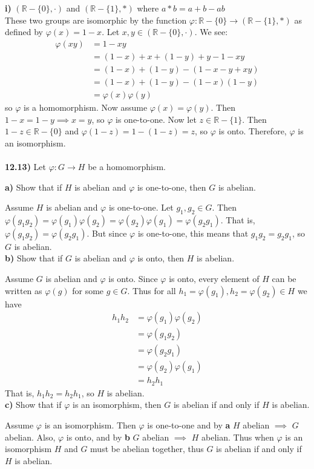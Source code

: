 \documentclass{scrartcl}
\begin{document}
\textbf{i)} $(\mathbb{R}-\{0\},\cdot)$ and $(\mathbb{R}-\{1\},*)$
where $a*b = a+b-ab$\\
These two groups are isomorphic by the function $\varphi : \mathbb{R}-\{0\}
\rightarrow (\mathbb{R}-\{1\},*)$ as defined by $\varphi(x) = 1-x$.
Let $x,y \in (\mathbb{R}-\{0\},\cdot)$. We see:
\begin{align*}
\varphi(xy) &= 1-xy\\
            &= (1-x)+x+(1-y)+y-1-xy\\
            &= (1-x)+(1-y)-(1-x-y+xy)\\
            &= (1-x)+(1-y)-(1-x)(1-y)\\
            &= \varphi(x)\varphi(y)
\end{align*}
so $\varphi$ is a homomorphism. Now assume $\varphi(x)=\varphi(y)$. Then
$1-x=1-y \implies x=y$, so $\varphi$ is one-to-one. Now let $z \in \mathbb{R}-
\{1\}$. Then $1-z \in \mathbb{R}-\{0\}$ and $\varphi(1-z) = 1-(1-z) = z$, so
$\varphi$ is onto. Therefore, $\varphi$ is an isomorphism.\\\\
\textbf{12.13)} Let $\varphi : G \rightarrow H$ be a homomorphism.

\textbf{a)} Show that if $H$ is abelian and $\varphi$ is one-to-one, then $G$
is abelian.

Assume $H$ is abelian and $\varphi$ is one-to-one. Let $g_1,g_2 \in G$. Then
$\varphi(g_1g_2)=\varphi(g_1)\varphi(g_2)=\varphi(g_2)\varphi(g_1)=
\varphi(g_2g_1)$. That is, $\varphi(g_1g_2)=\varphi(g_2g_1)$. But since 
$\varphi$ is one-to-one, this means that $g_1g_2=g_2g_1$, so $G$ is abelian.\\

\textbf{b)} Show that if $G$ is abelian and $\varphi$ is onto, then $H$ is
abelian.

Assume $G$ is abelian and $\varphi$ is onto. Since $\varphi$ is onto, every
element of $H$ can be written as $\varphi(g)$ for some $g \in G$. Thus for all
$h_1=\varphi(g_1),h_2=\varphi(g_2) \in H$ we have
\begin{align*}
h_1h_2 &= \varphi(g_1)\varphi(g_2)\\
      &= \varphi(g_1g_2)\\
      &= \varphi(g_2g_1)\\
      &= \varphi(g_2)\varphi(g_1)\\
      &= h_2h_1
\end{align*}
That is, $h_1h_2=h_2h_1$, so $H$ is abelian.\\

\textbf{c)} Show that if $\varphi$ is an isomorphism, then $G$ is abelian if and
only if $H$ is abelian.

Assume $\varphi$ is an isomorphism. Then $\varphi$ is one-to-one and by
\textbf{a} $H$ abelian $\implies$ $G$ abelian. Also, $\varphi$ is onto, and by
\textbf{b} $G$ abelian $\implies$ $H$ abelian. Thus when $\varphi$ is an
isomorphism $H$ and $G$ must be abelian together, thus $G$ is abelian if and
only if $H$ is abelian.
\end{document}
